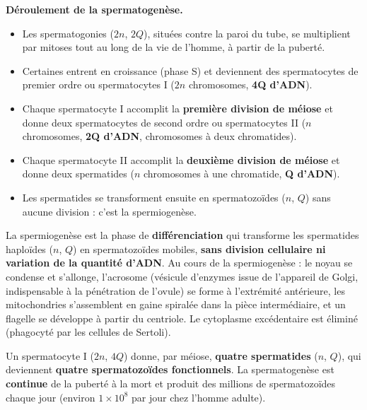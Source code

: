 \documentclass[11pt]{article}
\newcommand{\cle}[1]{{\popxbold\color{popdark}#1}}
\newcounter{popsec}
\newcounter{popsub}
\newcommand{\courssub}[1]{%
  \stepcounter{popsub}%
  \par\vspace{9pt}\noindent{\popxbold\fontsize{11.5}{13}\selectfont\color{popink}{\color{poporange}\thepopsec.\thepopsub}\hspace{6pt}#1}\par\nopagebreak\vspace{4pt}
}
\begin{document}
\textbf{Déroulement de la spermatogenèse.}\par
\begin{itemize}
\item Les \cle{spermatogonies} ($2n$, $2Q$), situées contre la paroi du tube, se multiplient par mitoses tout au long de la vie de l'homme, à partir de la puberté.
\item Certaines entrent en croissance (phase S) et deviennent des \cle{spermatocytes de premier ordre} ou spermatocytes I ($2n$ chromosomes, \textbf{4Q d'ADN}).
\item Chaque spermatocyte I accomplit la \textbf{première division de méiose} et donne deux \cle{spermatocytes de second ordre} ou spermatocytes II ($n$ chromosomes, \textbf{2Q d'ADN}, chromosomes à deux chromatides).
\item Chaque spermatocyte II accomplit la \textbf{deuxième division de méiose} et donne deux \cle{spermatides} ($n$ chromosomes à une chromatide, \textbf{Q d'ADN}).
\item Les spermatides se transforment ensuite en \cle{spermatozoïdes} ($n$, $Q$) sans aucune division : c'est la \cle{spermiogenèse}.
\end{itemize}

\begin{definition}[Spermiogenèse]
La \cle{spermiogenèse} est la phase de \textbf{différenciation} qui transforme les spermatides haploïdes ($n$, $Q$) en spermatozoïdes mobiles, \textbf{sans division cellulaire ni variation de la quantité d'ADN}. Au cours de la spermiogenèse : le noyau se condense et s'allonge, l'\cle{acrosome} (vésicule d'enzymes issue de l'appareil de Golgi, indispensable à la pénétration de l'ovule) se forme à l'extrémité antérieure, les mitochondries s'assemblent en gaine spiralée dans la pièce intermédiaire, et un \cle{flagelle} se développe à partir du centriole. Le cytoplasme excédentaire est éliminé (phagocyté par les cellules de Sertoli).
\end{definition}

\begin{aretenir}
Un spermatocyte I ($2n$, $4Q$) donne, par méiose, \textbf{quatre spermatides} ($n$, $Q$), qui deviennent \textbf{quatre spermatozoïdes fonctionnels}. La spermatogenèse est \textbf{continue} de la puberté à la mort et produit des millions de spermatozoïdes chaque jour (environ $1 \times 10^8$ par jour chez l'homme adulte).
\end{aretenir}

\courssub{L'oogenèse chez les Mammifères}
\end{document}
